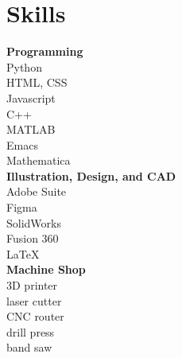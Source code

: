 \documentclass[10pt]{article} %
\begin{document}
\begin{minipage}[t]{0.2\textwidth}
 \section*{Skills}
\textbf{Programming}\\
Python\\
HTML, CSS\\
Javascript\\
C++\\
MATLAB\\
Emacs\\
Mathematica\\

\textbf{Illustration, Design, and CAD}\\
Adobe Suite\\
Figma\\
SolidWorks\\
Fusion 360\\
LaTeX\\
\textbf{Machine Shop}\\
3D printer\\ laser cutter\\ CNC router\\ drill press\\ band saw
\end{minipage}
\end{document}

